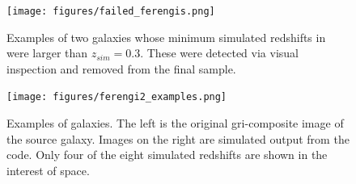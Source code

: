 \begin{figure}
\begin{center}
\texttt{[image: figures/failed\_ferengis.png]}
\caption{Examples of two galaxies whose minimum simulated redshifts in \ferengi{} were larger than $z_{sim}=0.3$. These were detected via visual inspection and removed from the final  sample.} 
\label{fig:ferengi_fails}
\end{center}
\end{figure}


\begin{figure}
\centering
\texttt{[image: figures/ferengi2\_examples.png]}
\caption{Examples of  galaxies. The left is the original gri-composite image of the source galaxy. Images on the right are simulated output from the \ferengi{} code. Only four of the eight simulated redshifts are shown in the interest of space.} 
\label{fig:ferengi2_examples}

\end{figure}
 


